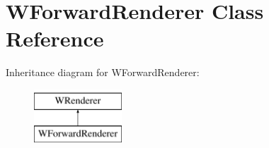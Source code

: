 \hypertarget{class_w_forward_renderer}{}\section{W\+Forward\+Renderer Class Reference}
\label{class_w_forward_renderer}
Inheritance diagram for W\+Forward\+Renderer\+:\begin{figure}[H]
\begin{center}
\leavevmode
\includegraphics[height=2.000000cm]{class_w_forward_renderer}
\end{center}
\end{figure}

